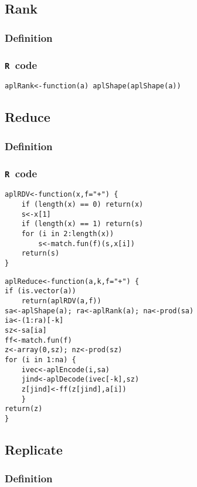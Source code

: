\documentclass[11pt]{amsart}
\theoremstyle{plain}
\theoremstyle{definition}
\theoremstyle{remark}
\newcommand{\tR}{\texttt{R}}
\begin{document}
\subsection{Rank}\quad
\subsubsection{Definition}
\subsubsection{\tR\ code}\quad
\begin{lstlisting}
aplRank<-function(a) aplShape(aplShape(a))
\end{lstlisting}

\subsection{Reduce}\quad
\subsubsection{Definition}
\subsubsection{\tR\ code}\quad
\begin{lstlisting}
aplRDV<-function(x,f="+") {
    if (length(x) == 0) return(x)
    s<-x[1]
    if (length(x) == 1) return(s)
    for (i in 2:length(x))
        s<-match.fun(f)(s,x[i])
    return(s)
}
\end{lstlisting}
\begin{lstlisting}
aplReduce<-function(a,k,f="+") {
if (is.vector(a)) 
    return(aplRDV(a,f))
sa<-aplShape(a); ra<-aplRank(a); na<-prod(sa)
ia<-(1:ra)[-k]
sz<-sa[ia]
ff<-match.fun(f)
z<-array(0,sz); nz<-prod(sz)
for (i in 1:na) {
    ivec<-aplEncode(i,sa)
    jind<-aplDecode(ivec[-k],sz)
    z[jind]<-ff(z[jind],a[i])
    }
return(z)   
}
\end{lstlisting}

\subsection{Replicate}\quad
\subsubsection{Definition}
\end{document}
